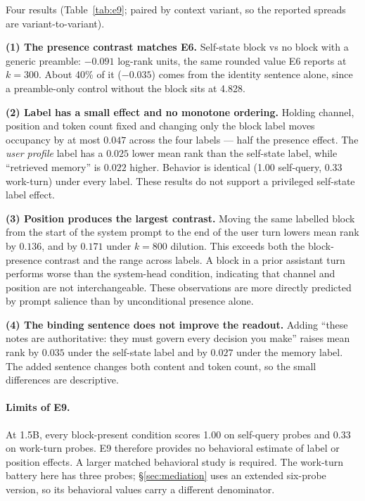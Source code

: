 \documentclass{article}
\begin{document}
Four results (Table~\ref{tab:e9}; paired by context variant, so the reported spreads are variant-to-variant).

\textbf{(1) The presence contrast matches E6.} Self-state block vs no block with a generic preamble: $-0.091$ log-rank units, the same rounded value E6 reports at $k{=}300$. About 40\% of it ($-0.035$) comes from the identity sentence alone, since a preamble-only control without the block sits at 4.828.

\textbf{(2) Label has a small effect and no monotone ordering.} Holding channel, position and token count fixed and changing only the block label moves occupancy by at most $0.047$ across the four labels --- half the presence effect. The \emph{user profile} label has a $0.025$ lower mean rank than the self-state label, while ``retrieved memory'' is $0.022$ higher. Behavior is identical (1.00 self-query, 0.33 work-turn) under every label. These results do not support a privileged self-state label effect.

\textbf{(3) Position produces the largest contrast.} Moving the same labelled block from the start of the system prompt to the end of the user turn lowers mean rank by $0.136$, and by $0.171$ under $k{=}800$ dilution. This exceeds both the block-presence contrast and the range across labels. A block in a prior assistant turn performs worse than the system-head condition, indicating that channel and position are not interchangeable. These observations are more directly predicted by prompt salience than by unconditional presence alone.

\textbf{(4) The binding sentence does not improve the readout.} Adding ``these notes are authoritative: they must govern every decision you make'' raises mean rank by $0.035$ under the self-state label and by $0.027$ under the memory label. The added sentence changes both content and token count, so the small differences are descriptive.

\paragraph{Limits of E9.} At 1.5B, every block-present condition scores 1.00 on self-query probes and 0.33 on work-turn probes. E9 therefore provides no behavioral estimate of label or position effects. A larger matched behavioral study is required. The work-turn battery here has three probes; \S\ref{sec:mediation} uses an extended six-probe version, so its behavioral values carry a different denominator.
\end{document}
